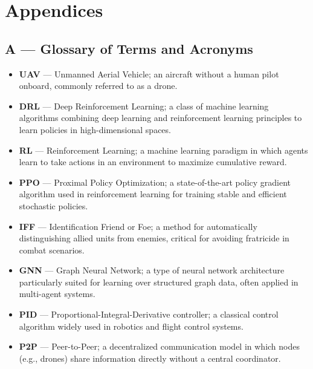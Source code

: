 \section*{Appendices}

    \subsection*{A — Glossary of Terms and Acronyms}
        \begin{itemize}
            \item \textbf{UAV} — Unmanned Aerial Vehicle; an aircraft without a human pilot onboard, commonly referred to as a drone.

            \item \textbf{DRL} — Deep Reinforcement Learning; a class of machine learning algorithms combining deep learning and reinforcement learning principles to learn policies in high-dimensional spaces.

            \item \textbf{RL} — Reinforcement Learning; a machine learning paradigm in which agents learn to take actions in an environment to maximize cumulative reward.

            \item \textbf{PPO} — Proximal Policy Optimization; a state-of-the-art policy gradient algorithm used in reinforcement learning for training stable and efficient stochastic policies.

            \item \textbf{IFF} — Identification Friend or Foe; a method for automatically distinguishing allied units from enemies, critical for avoiding fratricide in combat scenarios.

            \item \textbf{GNN} — Graph Neural Network; a type of neural network architecture particularly suited for learning over structured graph data, often applied in multi-agent systems.

            \item \textbf{PID} — Proportional-Integral-Derivative controller; a classical control algorithm widely used in robotics and flight control systems.

            \item \textbf{P2P} — Peer-to-Peer; a decentralized communication model in which nodes (e.g., drones) share information directly without a central coordinator.


\end{itemize}

